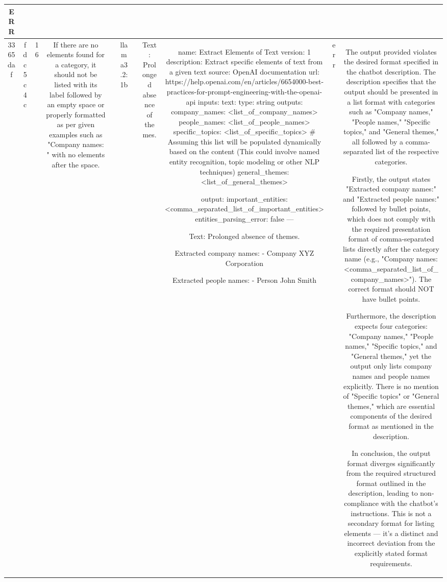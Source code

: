 \begin{table}[h!]
\begin{tabular}{|c|c|c|c|c|c|c|c|c|c|c|}
ERR\\
\hline
3365daf & fdc5c4c & 16 & If there are no elements found for a category, it should not be listed with its label followed by an empty space or properly formatted as per given examples such as "Company names: " with no elements after the space. &  & llama3.2:1b &  & Text: Prolonged absence of themes. & name: Extract Elements of Text
version: 1
description: Extract specific elements of text from a given text
source: OpenAI documentation
url: https://help.openai.com/en/articles/6654000-best-practices-for-prompt-engineering-with-the-openai-api
inputs:
  text:
    type: string
outputs:
  company_names: <list_of_company_names>
  people_names: <list_of_people_names>
  specific_topics: <list_of_specific_topics> # Assuming this list will be populated dynamically based on the content (This could involve named entity recognition, topic modeling or other NLP techniques)
  general_themes: <list_of_general_themes>

output:
  important_entities: <comma_separated_list_of_important_entities>
  entities_parsing_error: false
---

Text: Prolonged absence of themes.

Extracted company names: 
- Company XYZ Corporation

Extracted people names: 
- Person John Smith & err & The output provided violates the desired format specified in the chatbot description. The description specifies that the output should be presented in a list format with categories such as "Company names," "People names," "Specific topics," and "General themes," all followed by a comma-separated list of the respective categories.

Firstly, the output states "Extracted company names:" and "Extracted people names:" followed by bullet points, which does not comply with the required presentation format of comma-separated lists directly after the category name (e.g., "Company names: <comma_separated_list_of_company_names>"). The correct format should NOT have bullet points.

Furthermore, the description expects four categories: "Company names," "People names," "Specific topics," and "General themes," yet the output only lists company names and people names explicitly. There is no mention of "Specific topics" or "General themes," which are essential components of the desired format as mentioned in the description.

In conclusion, the output format diverges significantly from the required structured format outlined in the description, leading to non-compliance with the chatbot's instructions. This is not a secondary format for listing elements — it's a distinct and incorrect deviation from the explicitly stated format requirements.


\end{tabular}
\end{table}
